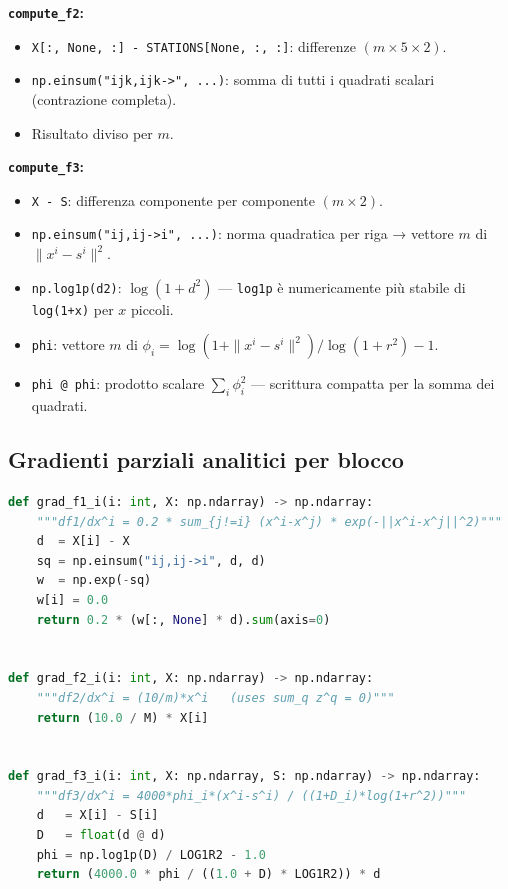 \documentclass[12pt,a4paper]{article}
\theoremstyle{definition}
\begin{document}
\textbf{\texttt{compute\_f2}:}
\begin{itemize}[nosep]
  \item \texttt{X[:, None, :] - STATIONS[None, :, :]}: differenze $(m \times 5 \times 2)$.
  \item \texttt{np.einsum("ijk,ijk->", ...)}: somma di tutti i quadrati scalari (contrazione completa).
  \item Risultato diviso per $m$.
\end{itemize}

\textbf{\texttt{compute\_f3}:}
\begin{itemize}[nosep]
  \item \texttt{X - S}: differenza componente per componente $(m \times 2)$.
  \item \texttt{np.einsum("ij,ij->i", ...)}: norma quadratica per riga → vettore $m$ di $\|x^i - s^i\|^2$.
  \item \texttt{np.log1p(d2)}: $\log(1 + d^2)$ — \texttt{log1p} è numericamente più stabile
        di \texttt{log(1+x)} per $x$ piccoli.
  \item \texttt{phi}: vettore $m$ di $\phi_i = \log(1+\|x^i-s^i\|^2)/\log(1+r^2) - 1$.
  \item \texttt{phi @ phi}: prodotto scalare $\sum_i \phi_i^2$ — scrittura compatta per la somma dei quadrati.
\end{itemize}

\subsection{Gradienti parziali analitici per blocco}

\begin{lstlisting}[language=Python]
def grad_f1_i(i: int, X: np.ndarray) -> np.ndarray:
    """df1/dx^i = 0.2 * sum_{j!=i} (x^i-x^j) * exp(-||x^i-x^j||^2)"""
    d  = X[i] - X
    sq = np.einsum("ij,ij->i", d, d)
    w  = np.exp(-sq)
    w[i] = 0.0
    return 0.2 * (w[:, None] * d).sum(axis=0)


def grad_f2_i(i: int, X: np.ndarray) -> np.ndarray:
    """df2/dx^i = (10/m)*x^i   (uses sum_q z^q = 0)"""
    return (10.0 / M) * X[i]


def grad_f3_i(i: int, X: np.ndarray, S: np.ndarray) -> np.ndarray:
    """df3/dx^i = 4000*phi_i*(x^i-s^i) / ((1+D_i)*log(1+r^2))"""
    d   = X[i] - S[i]
    D   = float(d @ d)
    phi = np.log1p(D) / LOG1R2 - 1.0
    return (4000.0 * phi / ((1.0 + D) * LOG1R2)) * d
\end{lstlisting}
\end{document}
